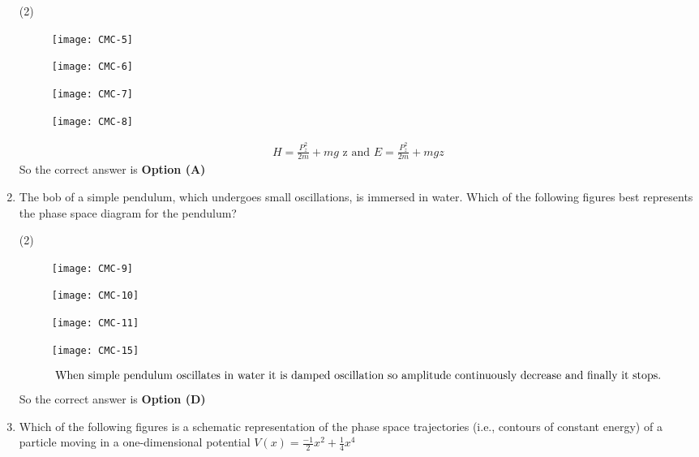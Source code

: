 \begin{enumerate}
\begin{tasks}(2)
\task[\textbf{A.}] \begin{figure}[H]
	\centering
	\texttt{[image: CMC-5]}
\end{figure}
\task[\textbf{B.}] \begin{figure}[H]
	\centering
	\texttt{[image: CMC-6]}
\end{figure}
\task[\textbf{C.}] \begin{figure}[H]
	\centering
	\texttt{[image: CMC-7]}
\end{figure}
\task[\textbf{D.}] \begin{figure}[H]
	\centering
	\texttt{[image: CMC-8]}
\end{figure}
\end{tasks}
\begin{answer}
\begin{align*}
H=\frac{P_{z}^{2}}{2 m}+m g\text{ z and }E=\frac{P_{z}^{2}}{2 m}+m g z
\end{align*}
So the correct answer is \textbf{Option (A)}	
\end{answer}
\item The bob of a simple pendulum, which undergoes small oscillations, is immersed in water. Which of the following figures best represents the phase space diagram for the pendulum?
{}
\begin{tasks}(2)
\task[\textbf{A.}] \begin{figure}[H]
	\centering
	\texttt{[image: CMC-9]}
\end{figure}
\task[\textbf{B.}] \begin{figure}[H]
	\centering
	\texttt{[image: CMC-10]}
\end{figure}
\task[\textbf{C.}] \begin{figure}[H]
	\centering
	\texttt{[image: CMC-11]}
\end{figure}
\task[\textbf{D.}] \begin{figure}[H]
	\centering
	\texttt{[image: CMC-15]}
\end{figure}
\end{tasks}
\begin{answer}
\begin{align*}
\intertext{When simple pendulum oscillates in water it is damped oscillation so amplitude continuously decrease and finally it stops.}
\end{align*}
So the correct answer is \textbf{Option (D)}
\end{answer}
\item Which of the following figures is a schematic representation of the phase space trajectories (i.e., contours of constant energy) of a particle moving in a one-dimensional potential $V(x)=\frac{-1}{2} x^{2}+\frac{1}{4} x^{4}$


\end{enumerate}
